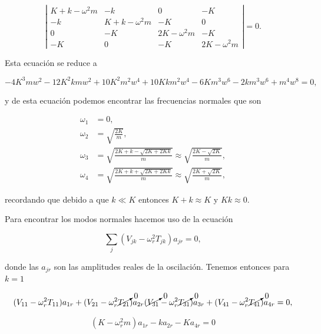 \documentclass[a4paper,10pt]{article}
\numberwithin{equation}{section}
\begin{document}
\begin{equation}
 \left|\begin{matrix}
      K+k - \omega^2m & -k & 0 & -K \\
      -k & K+k - \omega^2m & - K & 0 \\
      0 & - K & 2K -  \omega^2m & - K \\
      -K & 0 & - K & 2K -  \omega^2m
     \end{matrix}\right| = 0.
\end{equation}


Esta ecuación se reduce a 

\begin{equation}
 - 4 K^{3} m w^{2} - 12 K^{2} k m w^{2} + 10 K^{2} m^{2} w^{4} + 
 10 K k m^{2} w^{4} - 6 K m^{3} w^{6} - 2 k m^{3} w^{6} + m^{4} w^{8} = 0,
\end{equation}

y de esta ecuación podemos encontrar las frecuencias normales que son

\begin{align}
 \omega_1 &= 0, \\
 \omega_2 &= \sqrt{\frac{2K}{m}}, \\
 \omega_3 &= \sqrt{\frac{2K+k-\sqrt{2K+2Kk}}{m}} \approx 
 \sqrt{\frac{2K-\sqrt{2K}}{m}}, \\
 \omega_4 &=  \sqrt{\frac{2K+k+\sqrt{2K+2Kk}}{m}} \approx 
 \sqrt{\frac{2K+\sqrt{2K}}{m}},
\end{align}

recordando que debido a que $k\ll K$ entonces $K+k \approx K$ y $Kk \approx 0$.

\vspace{.3cm}

Para encontrar los modos normales hacemos uso de la ecuación

\begin{equation}
 \sum_j (V_{jk} - \omega^2_r T_{jk})a_{jr} = 0,
\end{equation}

donde las $a_{jr}$ son las amplitudes reales de la oscilación. Tenemos entonces 
para $k = 1$ 

\begin{equation}
 (V_{11} - \omega_r^2 T_{11})a_{1r} + (V_{21} - \omega_r^2 \cancelto{0}{T_{21}})a_{2r} 
 (\cancelto{0}{V_{31}} - \omega_r^2 \cancelto{0}{T_{31}})a_{3r} +
 (V_{41} - \omega_r^2 \cancelto{0}{T_{41}})a_{4r} = 0,
\end{equation}

\begin{equation}
 (K - \omega_r^2m)a_{1r} - ka_{2r} -Ka_{4r} = 0
\end{equation}
\end{document}
